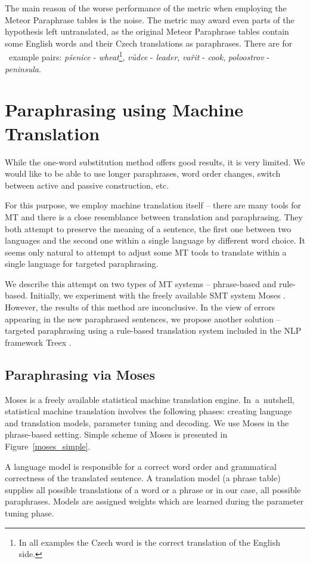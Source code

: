 \documentclass[11pt]{article}
\def\Fref#1{Figure~\ref{#1}}
\begin{document}
The main reason of the worse performance of the metric when employing the 
Meteor Paraphrase tables is the noise. The metric may award even parts of the 
hypothesis left untranslated, as the original Meteor Paraphrase tables contain 
some English words and their Czech translations as paraphrases. There are for
~example pairs: \textit{pšenice} - \textit{wheat}\footnote{In all examples the 
Czech word is the correct translation of the English side.}, \textit{vůdce} - 
\textit{leader}, \textit{vařit} -	\textit{cook}, \textit{poloostrov} - 
\textit{peninsula}.

\section{Paraphrasing using Machine Translation}
\label{MT}
While the one-word substitution method offers good results, it is very limited. 
We would like to be able to use longer paraphrases, word order changes, switch 
between active and passive construction, etc.

For this purpose, we employ machine translation itself -- there are many tools 
for MT and there is a close resemblance between translation and paraphrasing. 
They both attempt to preserve the meaning of a sentence, the first one between 
two languages and the second one within a single language by different word 
choice. It seems only natural to attempt to adjust some MT tools to translate 
within a single language for targeted paraphrasing. 

We describe this attempt on two types of MT systems -- phrase-based and 
rule-based. Initially, we experiment with the freely available SMT system 
Moses \cite{moses}. However, the results of this method are inconclusive. 
In the view of errors appearing in the new paraphrased sentences, we propose 
another solution -- targeted paraphrasing using a rule-based translation system 
included in the NLP framework Treex \cite{treex}.

\subsection{Paraphrasing via Moses}
Moses is a freely available statistical machine translation engine. 
In~a~nutshell, statistical machine translation involves the following phases: 
creating language and translation models, parameter tuning and decoding. 
We use Moses in the phrase-based setting. Simple scheme of Moses is presented
in \Fref{moses_simple}.

A language model is responsible for a correct word order and grammatical 
correctness of the translated sentence. A translation model (a phrase table) 
supplies all possible translations of a word or a phrase or in our case, all 
possible paraphrases. Models are assigned weights which are learned during the 
parameter tuning phase.
\end{document}
